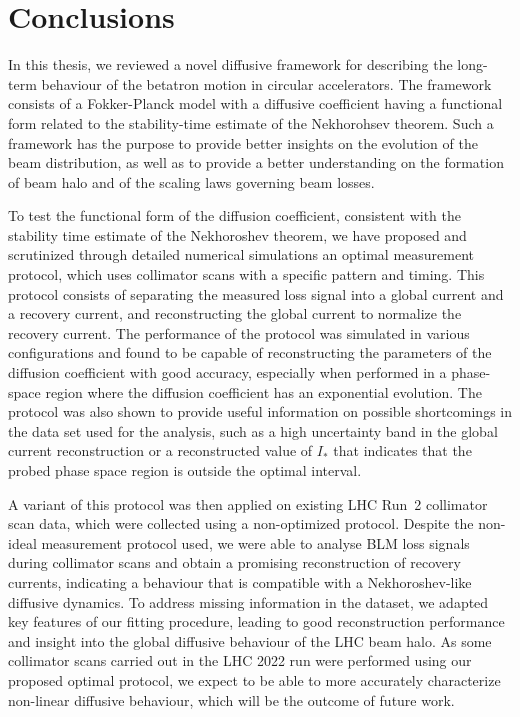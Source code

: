 \chapter*{Conclusions}

In this thesis, we reviewed a novel diffusive framework for describing the long-term behaviour of the betatron motion in circular accelerators. The framework consists of a Fokker-Planck model with a diffusive coefficient having a functional form related to the stability-time estimate of the Nekhorohsev theorem. Such a framework has the purpose to provide better insights on the evolution of the beam distribution, as well as to provide a better understanding on the formation of beam halo and of the scaling laws governing beam losses.

To test the functional form of the diffusion coefficient, consistent with the stability time estimate of the Nekhoroshev theorem, we have proposed and scrutinized through detailed numerical simulations an optimal measurement protocol, which uses collimator scans with a specific pattern and timing. This protocol consists of separating the measured loss signal into a global current and a recovery current, and reconstructing the global current to normalize the recovery current. The performance of the protocol was simulated in various configurations and found to be capable of reconstructing the parameters of the diffusion coefficient with good accuracy, especially when performed in a phase-space region where the diffusion coefficient has an exponential evolution. The protocol was also shown to provide useful information on possible shortcomings in the data set used for the analysis, such as a high uncertainty band in the global current reconstruction or a reconstructed value of $I_\ast$ that indicates that the probed phase space region is outside the optimal interval.

A variant of this protocol was then applied on existing LHC Run~2 collimator scan data, which were collected using a non-optimized protocol. Despite the non-ideal measurement protocol used, we were able to analyse BLM loss signals during collimator scans and obtain a promising reconstruction of recovery currents, indicating a behaviour that is compatible with a Nekhoroshev-like diffusive dynamics. To address missing information in the dataset, we adapted key features of our fitting procedure, leading to good reconstruction performance and insight into the global diffusive behaviour of the LHC beam halo. As some collimator scans carried out in the LHC 2022 run were performed using our proposed optimal protocol, we expect to be able to more accurately characterize non-linear diffusive behaviour, which will be the outcome of future work.

